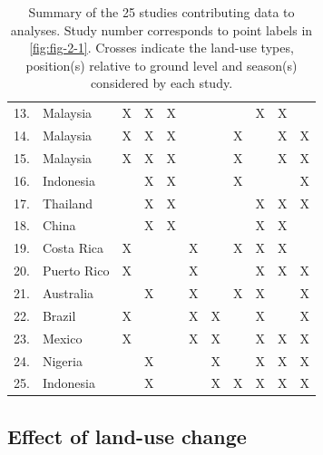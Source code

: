 \documentclass[12pt,a4paper,]{report}
\theoremstyle{definition}
\theoremstyle{definition}
\theoremstyle{definition}
\theoremstyle{remark}
\begin{document}
\begin{table}
\begin{tabular}{p{6.5cm}p{2.5cm}p{1.5cm}p{1.5cm}p{1.5cm}p{1.5cm}p{1.5cm}p{1.1cm}p{1.1cm}p{1.13cm}p{1.13cm}}
    13. \citet{adachi_differences_2006}              & Malaysia      & X & X & X &   &  &   & X &X &   \\
    14. \citet{hardwick_aboveground_2016}            & Malaysia      & X & X & X &   &  & X &   &X & X \\
    15. \citet{hardwick_relationship_2015}           & Malaysia      & X & X & X &   &  & X &   &X & X \\
    16. \citet{klein_predatorprey_2002}              & Indonesia     &   & X & X &   &  & X &   &  & X \\
    17. \citet{wangluk_role_2013}                    & Thailand      &   & X & X &   &  &   & X &X & X \\
    18. \citet{werner_n2o_2006}                      & China         &   & X & X &   &  &   & X &X &   \\
    19. \citet{holl_factors_1999}                    & Costa Rica    & X &   &   & X &  & X & X &X &   \\
    20. \citet{liu_exotic_2002}                      & Puerto Rico   & X &   &   & X &  &   & X &X & X \\
    21. \citet{king_ants_1998}                       & Australia     &   & X &   & X &  & X & X &  & X \\
    22. \citet{badejo_response_2004}                 & Brazil        & X &   &   & X &X &   & X &  & X \\
    23. \citet{campos_response_2006}                 & Mexico        & X &   &   & X &X &   & X &X & X \\
    24. \citet{badejo_seasonal_1990}                 & Nigeria       &   & X &   &   &X &   & X &X & X \\
    25. \citet{furukawa_effect_2005}                 & Indonesia     &   & X &   &   &X & X & X &X & X \\
\bottomrule
\end{tabular}
\caption{\label{tab:tab-2-2}Summary of the 25 studies contributing data to analyses. Study number corresponds to point labels in \autoref{fig:fig-2-1}. Crosses indicate the land-use types, position(s) relative to ground level and season(s) considered by each study.}
\end{table}

\subsection{Effect of land-use change}\label{effect-of-land-use-change}
\end{document}
